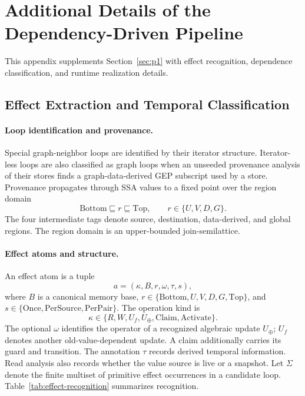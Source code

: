 
\section{Additional Details of the Dependency-Driven Pipeline}
\label{app:p1}
This appendix supplements Section~\ref{sec:p1} with effect recognition,
dependence classification, and runtime realization details.

\subsection{Effect Extraction and Temporal Classification}
\label{app:p1-effects}
\paragraph{Loop identification and provenance.}
Special graph-neighbor loops are identified by their iterator structure.
Iterator-less loops are also classified as graph loops when an unseeded
provenance analysis of their stores finds a graph-data-derived GEP
subscript used by a store. Provenance propagates through SSA values to a
fixed point over the region domain
\[
\mathrm{Bottom}\sqsubseteq r\sqsubseteq\mathrm{Top},
\qquad r\in\{U,V,D,G\}.
\]
The four intermediate tags denote source, destination, data-derived, and
global regions. The region domain is an upper-bounded join-semilattice.

\paragraph{Effect atoms and structure.}
An effect atom is a tuple
\[
a=(\kappa,B,r,\omega,\tau,s),
\]
where $B$ is a canonical memory base,
$r\in\{\mathrm{Bottom},U,V,D,G,\mathrm{Top}\}$, and
$s\in\{\mathrm{Once},\mathrm{PerSource},\mathrm{PerPair}\}$.
The operation kind is
\[
\kappa\in\{R,W,U_f,U_{\oplus},\mathrm{Claim},\mathrm{Activate}\}.
\]
The optional $\omega$ identifies the operator of a recognized algebraic
update $U_{\oplus}$; $U_f$ denotes another old-value-dependent update.
A claim additionally carries its guard and transition. The annotation
$\tau$ records derived temporal information. Read analysis also records
whether the value source is live or a snapshot. Let $\Sigma$ denote the
finite multiset of primitive effect occurrences in a candidate loop.
Table~\ref{tab:effect-recognition} summarizes recognition.

